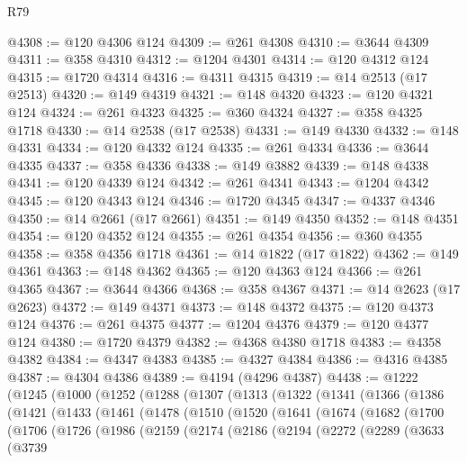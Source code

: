 \begin{lexlean}{R79}
\begin{coremodule}
@4308 := @120 @4306 @124
@4309 := @261 @4308
@4310 := @3644 @4309
@4311 := @358 @4310
@4312 := @1204 @4301
@4314 := @120 @4312 @124
@4315 := @1720 @4314
@4316 := @4311 @4315
@4319 := @14 @2513 (@17 @2513)
@4320 := @149 @4319
@4321 := @148 @4320
@4323 := @120 @4321 @124
@4324 := @261 @4323
@4325 := @360 @4324
@4327 := @358 @4325 @1718
@4330 := @14 @2538 (@17 @2538)
@4331 := @149 @4330
@4332 := @148 @4331
@4334 := @120 @4332 @124
@4335 := @261 @4334
@4336 := @3644 @4335
@4337 := @358 @4336
@4338 := @149 @3882
@4339 := @148 @4338
@4341 := @120 @4339 @124
@4342 := @261 @4341
@4343 := @1204 @4342
@4345 := @120 @4343 @124
@4346 := @1720 @4345
@4347 := @4337 @4346
@4350 := @14 @2661 (@17 @2661)
@4351 := @149 @4350
@4352 := @148 @4351
@4354 := @120 @4352 @124
@4355 := @261 @4354
@4356 := @360 @4355
@4358 := @358 @4356 @1718
@4361 := @14 @1822 (@17 @1822)
@4362 := @149 @4361
@4363 := @148 @4362
@4365 := @120 @4363 @124
@4366 := @261 @4365
@4367 := @3644 @4366
@4368 := @358 @4367
@4371 := @14 @2623 (@17 @2623)
@4372 := @149 @4371
@4373 := @148 @4372
@4375 := @120 @4373 @124
@4376 := @261 @4375
@4377 := @1204 @4376
@4379 := @120 @4377 @124
@4380 := @1720 @4379
@4382 := @4368 @4380 @1718
@4383 := @4358 @4382
@4384 := @4347 @4383
@4385 := @4327 @4384
@4386 := @4316 @4385
@4387 := @4304 @4386
@4389 := @4194 (@4296 @4387)
@4438 := @1222
    (@1245
      (@1000
        (@1252
          (@1288
            (@1307
              (@1313
                (@1322
                  (@1341
                    (@1366
                      (@1386
                        (@1421
                          (@1433
                            (@1461
                              (@1478
                                (@1510
                                  (@1520
                                    (@1641
                                      (@1674
                                        (@1682
                                          (@1700
                                            (@1706
                                              (@1726
                                                (@1986
                                                  (@2159
                                                    (@2174
                                                      (@2186
                                                        (@2194
                                                          (@2272
                                                            (@2289
                                                              (@3633
                                                                (@3739

\end{coremodule}
\end{lexlean}

